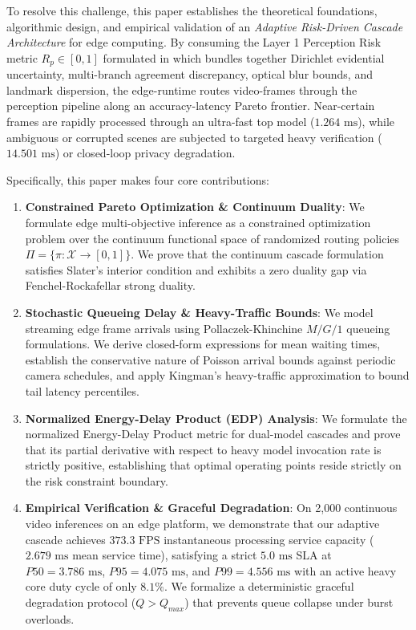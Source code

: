 \documentclass[conference]{IEEEtran}
\begin{document}
To resolve this challenge, this paper establishes the theoretical foundations, algorithmic design, and empirical validation of an \textit{Adaptive Risk-Driven Cascade Architecture} for edge computing. By consuming the Layer 1 Perception Risk metric $R_p \in [0,1]$ formulated in \cite{kumar2026scholar22} which bundles together Dirichlet evidential uncertainty, multi-branch agreement discrepancy, optical blur bounds, and landmark dispersion, the edge-runtime routes video-frames through the perception pipeline along an accuracy-latency Pareto frontier. Near-certain frames are rapidly processed through an ultra-fast top model ($1.264\text{ ms}$), while ambiguous or corrupted scenes are subjected to targeted heavy verification ($14.501\text{ ms}$) or closed-loop privacy degradation.

Specifically, this paper makes four core contributions:
\begin{enumerate}
    \item \textbf{Constrained Pareto Optimization \& Continuum Duality}: We formulate edge multi-objective inference as a constrained optimization problem over the continuum functional space of randomized routing policies $\Pi = \{\pi: \mathcal{X} \to [0, 1]\}$. We prove that the continuum cascade formulation satisfies Slater's interior condition and exhibits a zero duality gap via Fenchel-Rockafellar strong duality.
    \item \textbf{Stochastic Queueing Delay \& Heavy-Traffic Bounds}: We model streaming edge frame arrivals using Pollaczek-Khinchine $M/G/1$ queueing formulations. We derive closed-form expressions for mean waiting times, establish the conservative nature of Poisson arrival bounds against periodic camera schedules, and apply Kingman's heavy-traffic approximation to bound tail latency percentiles.
    \item \textbf{Normalized Energy-Delay Product (EDP) Analysis}: We formulate the normalized Energy-Delay Product metric for dual-model cascades and prove that its partial derivative with respect to heavy model invocation rate is strictly positive, establishing that optimal operating points reside strictly on the risk constraint boundary.
    \item \textbf{Empirical Verification \& Graceful Degradation}: On 2,000 continuous video inferences on an edge platform, we demonstrate that our adaptive cascade achieves $373.3\text{ FPS}$ instantaneous processing service capacity ($2.679\text{ ms}$ mean service time), satisfying a strict $5.0\text{ ms}$ SLA at $P50 = 3.786\text{ ms}$, $P95 = 4.075\text{ ms}$, and $P99 = 4.556\text{ ms}$ with an active heavy core duty cycle of only $8.1\%$. We formalize a deterministic graceful degradation protocol ($Q > Q_{max}$) that prevents queue collapse under burst overloads.
\end{enumerate}
\end{document}
